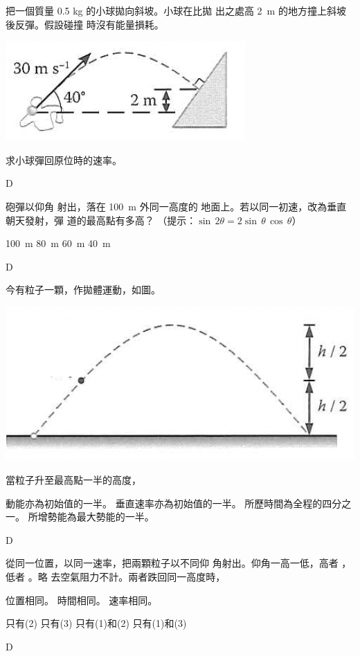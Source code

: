 {
    把一個質量 0.5 kg 的小球拋向斜坡。小球在比拋 出之處高 \qty{2}{m} 的地方撞上斜坡後反彈。假設碰撞 時沒有能量損耗。\bigskip
    {\par\centering
        \includegraphics[width=.35\textwidth]{assets/157e649d.png}
        \par}\bigskip
    求小球彈回原位時的速率。
    \begin{tasks}
        \task {}
        \task {}
        \task {}
        \task {}
    \end{tasks}
}{D}

{
    砲彈以仰角  射出，落在 \qty{100}{m} 外同一高度的 地面上。若以同一初速，改為垂直朝天發射，彈 道的最高點有多高？ （提示：$\sin\,2\theta=2\sin\,\theta\,\cos\,\theta$）
    \begin{tasks}
        \task \qty{100}{m}
        \task \qty{80}{m}
        \task \qty{60}{m}
        \task \qty{40}{m}
    \end{tasks}
}{D}

{
    今有粒子一顆，作拋體運動，如圖。\bigskip
    {\par\centering
        \includegraphics[width=.4\textwidth]{assets/4d5ef752.png}
        \par}
    \bigskip
    當粒子升至最高點一半的高度，
    \begin{tasks}
        \task 動能亦為初始值的一半。
        \task 垂直速率亦為初始值的一半。
        \task 所歷時間為全程的四分之一。
        \task 所增勢能為最大勢能的一半。
    \end{tasks}
}{D}

{
    從同一位置，以同一速率，把兩顆粒子以不同仰 角射出。仰角一高一低，高者  ，低者  。略 去空氣阻力不計。兩者跌回同一高度時，
    \begin{statements}
        \task 位置相同。
        \task 時間相同。
        \task 速率相同。
    \end{statements}
    \begin{tasks}
        \task 只有(2)
        \task 只有(3)
        \task 只有(1)和(2)
        \task 只有(1)和(3)
    \end{tasks}
}{D}

